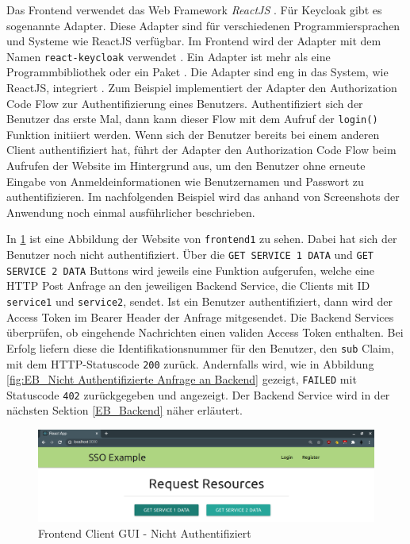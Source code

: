Das Frontend verwendet das Web Framework \textit{ReactJS} \cite{EB43}. Für Keycloak gibt es sogenannte Adapter. Diese Adapter sind für verschiedenen Programmiersprachen und Systeme wie ReactJS verfügbar. Im Frontend wird der Adapter mit dem Namen \texttt{react-keycloak} verwendet \cite{EB36}. Ein Adapter ist mehr als eine Programmbibliothek oder ein Paket \cite{EB43}. Die Adapter sind eng in das System, wie ReactJS, integriert \cite{EB43}. Zum Beispiel implementiert der Adapter den Authorization Code Flow zur Authentifizierung eines Benutzers. Authentifiziert sich der Benutzer das erste Mal, dann kann dieser Flow mit dem Aufruf der \texttt{login()} Funktion initiiert werden. Wenn sich der Benutzer bereits bei einem anderen Client authentifiziert hat, führt der Adapter den Authorization Code Flow beim Aufrufen der Website im Hintergrund aus, um den Benutzer ohne erneute Eingabe von Anmeldeinformationen wie Benutzernamen und Passwort zu authentifizieren. Im nachfolgenden Beispiel wird das anhand von Screenshots der Anwendung noch einmal ausführlicher beschrieben.

In \ref{fig:EB_Nicht Authentifiziert} ist eine Abbildung der Website von \texttt{frontend1} zu sehen. Dabei hat sich der Benutzer noch nicht authentifiziert. Über die \texttt{GET SERVICE 1 DATA} und \texttt{GET SERVICE 2 DATA} Buttons wird jeweils eine Funktion aufgerufen, welche eine HTTP Post Anfrage an den jeweiligen Backend Service, die Clients mit ID \texttt{service1} und \texttt{service2}, sendet. Ist ein Benutzer authentifiziert, dann wird der Access Token im Bearer Header der Anfrage mitgesendet. Die Backend Services überprüfen, ob eingehende Nachrichten einen validen Access Token enthalten. Bei Erfolg liefern diese die Identifikationsnummer für den Benutzer, den \texttt{sub} Claim, mit dem HTTP-Statuscode \texttt{200} zurück. Andernfalls wird, wie in Abbildung \ref{fig:EB_Nicht Authentifizierte Anfrage an Backend} gezeigt, \texttt{FAILED} mit Statuscode \texttt{402} zurückgegeben und angezeigt. Der Backend Service wird in der nächsten Sektion \ref{EB_Backend} näher erläutert.

\begin{figure}[!ht]
	\centering
	\includegraphics[width=1\textwidth]{Images/Ebert/FrontendLoggedOut.PNG}
	\caption{Frontend Client GUI - Nicht Authentifiziert}
	\label{fig:EB_Nicht Authentifiziert}
\end{figure}

